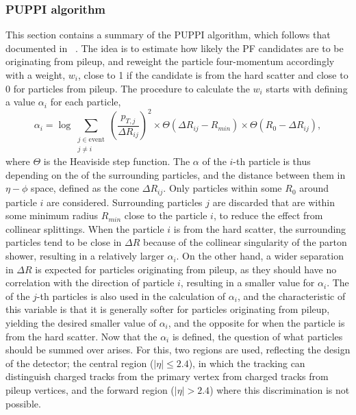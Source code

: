 \subsubsection*{PUPPI algorithm}
\noindent
\justify
This section contains a summary of the PUPPI algorithm, which follows that documented in ~\cite{Bertolini:2014bba}. 
The idea is to estimate how likely the PF candidates are to be originating from pileup, and reweight the particle four-momentum accordingly with a weight, $w_{i}$, close to 1 if the candidate is from the hard scatter and close to 0 for particles from pileup. 
The procedure to calculate the $w_{i}$ starts with defining a value $\alpha_{i}$ for each particle, 
\begin{equation}
  \alpha_i = \log \sum_{\substack{j \in \text{event} \\ j \neq i}} \left(\frac{p_{T, j}}{\Delta R_{ij}}\right)^{2} \times \Theta(\Delta R_{ij}-R_{min})\times \Theta(R_{0}-\Delta R_{ij}),
\end{equation}
where $\Theta$ is the Heaviside step function. 
The $\alpha$ of the $i$-th particle is thus depending on the \pt of the surrounding particles, and the distance between them in $\eta-\phi$ space, defined as the cone $\Delta R_{ij}$.
Only particles within some $R_{0}$ around particle $i$ are considered. 
Surrounding particles $j$ are discarded that are within some minimum radius $R_{min}$ close to the particle $i$, to reduce the effect from collinear splittings. 
When the particle $i$ is from the hard scatter, the surrounding particles tend to be close in $\Delta R$ because of the collinear singularity of the parton shower, resulting in a relatively larger $\alpha_{i}$. 
On the other hand, a wider separation in $\Delta R$ is expected for particles originating from pileup, as they should have no correlation with the direction of particle $i$, resulting in a smaller value for $\alpha_{i}$. 
The \pt of the $j$-th particles is also used in the calculation of $\alpha_{i}$, and the characteristic of this variable is that it is generally softer for particles originating from pileup, yielding the desired smaller value of $\alpha_{i}$, and the opposite for when the particle is from the hard scatter. 
\newpara
\noindent\justify
Now that the $\alpha_{i}$ is defined, the question of what particles should be summed over arises. 
For this, two regions are used, reflecting the design of the detector; the central region ($|\eta|\leq2.4$), in which the tracking can distinguish charged tracks from the primary vertex from charged tracks from pileup vertices, and the forward region ($|\eta|>2.4$) where this discrimination is not possible.
